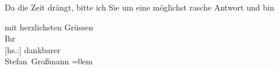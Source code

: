 \pstart
           {\pb}Da die Zeit drängt, bitte ich Sie um eine
               möglichst rasche Antwort und bin\pend
           
\pstart
           mit herzlichsten Grüssen{\\[\baselineskip]}Ihr{\\[\baselineskip]}{[}hs.:{]} dankbarer{\\[\baselineskip]}\spacefill\mbox{Stefan Großmann}\pend
           \leftskip=0em{}\endnumbering{}  
      
